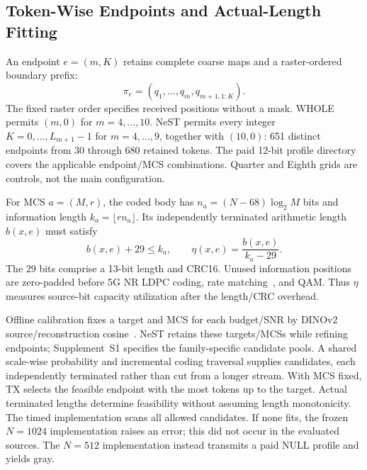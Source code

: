 \subsection{Token-Wise Endpoints and Actual-Length Fitting}
An endpoint $e=(m,K)$ retains complete coarse maps and a raster-ordered boundary prefix:
\begin{equation}
\pi_e=(q_1,\ldots,q_m,q_{m+1,1:K}).
\label{eq:prefix}
\end{equation}
The fixed raster order specifies received positions without a mask. WHOLE permits $(m,0)$ for $m=4,\ldots,10$. NeST permits every integer $K=0,\ldots,L_{m+1}-1$ for $m=4,\ldots,9$, together with $(10,0)$: 651 distinct endpoints from 30 through 680 retained tokens. The paid 12-bit profile directory covers the applicable endpoint/MCS combinations. Quarter and Eighth grids are controls, not the main configuration.

For MCS $a=(M,r)$, the coded body has $n_a=(N-68)\log_2M$ bits and information length $k_a=\lfloor rn_a\rfloor$. Its independently terminated arithmetic length $b(x,e)$ must satisfy
\begin{equation}
b(x,e)+29\leq k_a,\qquad \eta(x,e)=\frac{b(x,e)}{k_a-29}.
\label{eq:budget}
\end{equation}
The 29 bits comprise a 13-bit length and CRC16. Unused information positions are zero-padded before 5G NR LDPC coding, rate matching~\cite{nr}, and QAM. Thus $\eta$ measures source-bit capacity utilization after the length/CRC overhead.

Offline calibration fixes a target and MCS for each budget/SNR by DINOv2 source/reconstruction cosine~\cite{dinov2}. NeST retains these targets/MCSs while refining endpoints; Supplement~S1 specifies the family-specific candidate pools. A shared scale-wise probability and incremental coding traversal supplies candidates, each independently terminated rather than cut from a longer stream. With MCS fixed, TX selects the feasible endpoint with the most tokens up to the target. Actual terminated lengths determine feasibility without assuming length monotonicity. The timed implementation scans all allowed candidates. If none fits, the frozen $N=1024$ implementation raises an error; this did not occur in the evaluated sources. The $N=512$ implementation instead transmits a paid NULL profile and yields gray.

\ifCLASSOPTIONonecolumn\else\fi
